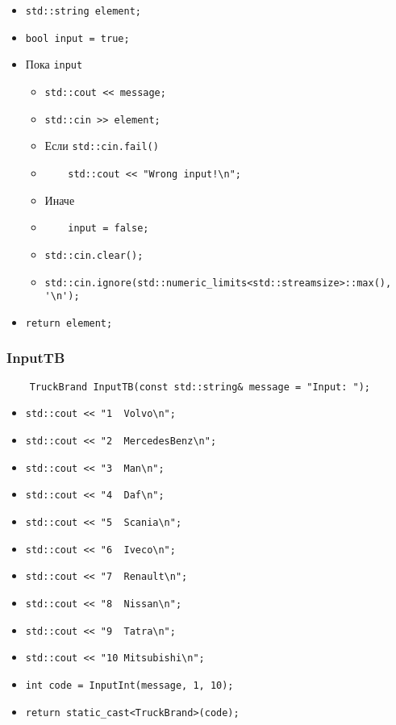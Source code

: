 \begin{itemize}
    \item \verb|std::string element;|
    \item \verb|bool input = true;|
    \item Пока \verb|input|
        \begin{itemize}
            \item \verb|std::cout << message;|
            \item \verb|std::cin >> element;|
            \item Если \verb|std::cin.fail()|
            \item \verb|    std::cout << "Wrong input!\n";|
            \item Иначе
            \item \verb|    input = false;|
            \item \verb|std::cin.clear();|
            \item \verb|std::cin.ignore(std::numeric_limits<std::streamsize>::max(), '\n');|
        \end{itemize}
    \item \verb|return element;|
\end{itemize}

\subsubsection{InputTB}

\begin{lstlisting}
    TruckBrand InputTB(const std::string& message = "Input: ");
\end{lstlisting}

\begin{itemize}
    \item \verb|std::cout << "1  Volvo\n";|
    \item \verb|std::cout << "2  MercedesBenz\n";|
    \item \verb|std::cout << "3  Man\n";|
    \item \verb|std::cout << "4  Daf\n";|
    \item \verb|std::cout << "5  Scania\n";|
    \item \verb|std::cout << "6  Iveco\n";|
    \item \verb|std::cout << "7  Renault\n";|
    \item \verb|std::cout << "8  Nissan\n";|
    \item \verb|std::cout << "9  Tatra\n";|
    \item \verb|std::cout << "10 Mitsubishi\n";|
    \item \verb|int code = InputInt(message, 1, 10);|
    \item \verb|return static_cast<TruckBrand>(code);|
\end{itemize}

